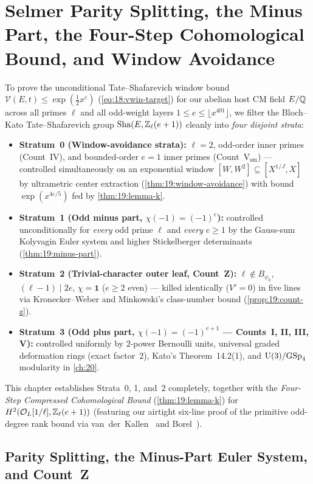 \chapter{Selmer Parity Splitting, the Minus Part, the Four-Step Cohomological Bound, and Window Avoidance}
\label{ch:19}

To prove the unconditional Tate--Shafarevich window bound $\mathcal{V}(E, t) \le \exp(\frac{1}{2}x^\varepsilon)$ (\eqref{eq:18:vwin-target}) for our abelian host CM field $E/\mathbb{Q}$ across all primes $\ell$ and all odd-weight layers $1 \le e \le \lfloor x^{401} \rfloor$, we filter the Bloch--Kato Tate--Shafarevich group $\mathrm{Sha}(E, \mathbb{Z}_\ell(e+1))$ cleanly into \emph{four disjoint strata}:
\begin{itemize}
\item \textbf{Stratum~0 (Window-avoidance strata):} $\ell = 2$, odd-order inner primes (Count~IV), and bounded-order $e = 1$ inner primes (Count~$\mathrm{V}_{\mathrm{sm}}$) — controlled simultaneously on an exponential window $[W, W^2] \subseteq [X^{1/J}, X]$ by ultrametric center extraction (\cref{thm:19:window-avoidance}) with bound $\exp(x^{4\varepsilon/5})$ fed by \cref{thm:19:lemma-k}.
\item \textbf{Stratum~1 (Odd minus part, $\chi(-1) = (-1)^e$):} controlled unconditionally for \emph{every} odd prime $\ell$ and \emph{every} $e \ge 1$ by the Gauss-sum Kolyvagin Euler system and higher Stickelberger determinants (\cref{thm:19:minus-part}).
\item \textbf{Stratum~2 (Trivial-character outer leaf, Count~Z):} $\ell \notin B_{\psi_0}$, $(\ell - 1) \mid 2e$, $\chi = \mathbf{1}$ ($e \ge 2$ even) — killed identically ($V' = 0$) in five lines via Kronecker--Weber and Minkowski's class-number bound (\cref{prop:19:count-z}).
\item \textbf{Stratum~3 (Odd plus part, $\chi(-1) = (-1)^{e+1}$ — Counts~I, II, III, V):} controlled uniformly by $2$-power Bernoulli units, universal graded deformation rings (exact factor~$2$), Kato's Theorem~14.2(1), and $\mathrm{U}(3) / \mathrm{GSp}_4$ modularity in \cref{ch:20}.
\end{itemize}

This chapter establishes Strata~0, 1, and~2 completely, together with the \emph{Four-Step Compressed Cohomological Bound} (\cref{thm:19:lemma-k}) for $H^2(\mathcal{O}_L[1/\ell], \mathbb{Z}_\ell(e+1))$ (featuring our airtight six-line proof of the primitive odd-degree rank bound via van~der~Kallen~\cite{vanderKallen1980} and Borel~\cite{Borel1974}).

\section{Parity Splitting, the Minus-Part Euler System, and Count~Z}
\label{sec:19:minus-part}

